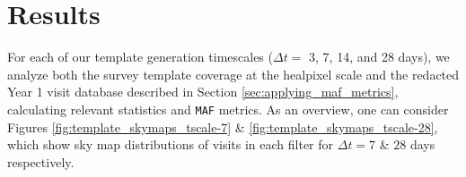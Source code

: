 \documentclass[preprintm,linenumbers]{aastex631}
\newcommand{\maf}{\texttt{MAF}\xspace}
\begin{document}
		
		\section{Results}
		\label{sec:results}
		
		
		For each of our template generation timescales ($\Delta t =$ 3, 7, 14, and 28 days), we analyze both the survey template coverage at the healpixel scale and the redacted Year 1 visit database described in Section \ref{sec:applying_maf_metrics}, calculating relevant statistics and \maf metrics. 
  As an overview, one can consider Figures \ref{fig:template_skymaps_tscale-7} \& \ref{fig:template_skymaps_tscale-28}, which show sky map distributions of visits in each filter for $\Delta t = 7$ \& $28$ days respectively.
\end{document}

